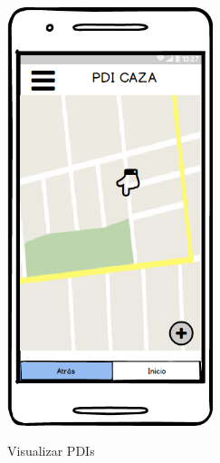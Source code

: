 \begin{figure}[htbp]
\begin{minipage}[b]{0.5\linewidth}
\end{minipage}
\hspace{0.5cm} %
\begin{minipage}[b]{0.5\linewidth}
\centering
\includegraphics[width=6cm]{maqueta/pdi2.png}
 \label{figura2}
\caption{Visualizar PDIs}

\end{minipage}
\end{figure}
	

